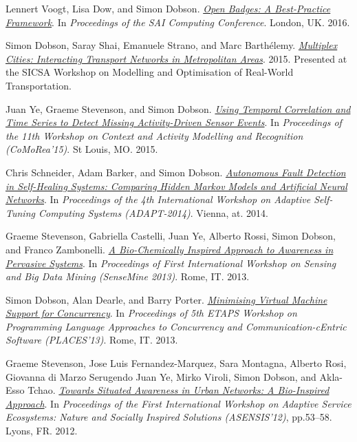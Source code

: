 \documentclass[11pt]{article}
\begin{document}
\label{org9da4b8c}Lennert Voogt, Lisa Dow, and Simon Dobson.  \emph{\href{https://simondobson.org/softcopy/open-badges-best-practice-16.pdf}{Open Badges: A Best-Practice Framework}}. In \emph{Proceedings of the SAI Computing Conference}. London, UK. 2016.

\label{org7ed4e9d}Simon Dobson, Saray Shai, Emanuele Strano, and Marc Barthélemy.  \emph{\href{https://simondobson.org/softcopy/urban-networks-sicsa.pdf}{Multiplex Cities: Interacting Transport Networks in Metropolitan Areas}}. 2015. Presented at the SICSA Workshop on Modelling and Optimisation of Real-World Transportation.

\label{org1a6029d}Juan Ye, Graeme Stevenson, and Simon Dobson.  \emph{\href{https://simondobson.org/softcopy/comorea-15.pdf}{Using Temporal Correlation and Time Series to Detect Missing Activity-Driven Sensor Events}}. In \emph{Proceedings of the 11th Workshop on Context and Activity Modelling and Recognition (CoMoRea’15)}. St Louis, MO. 2015.

\label{orgf545693}Chris Schneider, Adam Barker, and Simon Dobson.  \emph{\href{https://simondobson.org/softcopy/adapt14.pdf}{Autonomous Fault Detection in Self-Healing Systems: Comparing Hidden Markov Models and Artificial Neural Networks}}. In \emph{Proceedings of the 4th International Workshop on Adaptive Self-Tuning Computing Systems (ADAPT-2014)}. Vienna, at. 2014.

\label{orge16f070}Graeme Stevenson, Gabriella Castelli, Juan Ye, Alberto Rossi, Simon Dobson, and Franco Zambonelli.  \emph{\href{https://simondobson.org/softcopy/sensemine13.pdf}{A Bio-Chemically Inspired Approach to Awareness in Pervasive Systems}}. In \emph{Proceedings of First International Workshop on Sensing and Big Data Mining (SenseMine 2013)}. Rome, IT. 2013.

\label{orgdd9338e}Simon Dobson, Alan Dearle, and Barry Porter.  \emph{\href{https://simondobson.org/softcopy/places-2013-final.pdf}{Minimising Virtual Machine Support for Concurrency}}. In \emph{Proceedings of 5th ETAPS Workshop on Programming Language Approaches to Concurrency and Communication-cEntric Software (PLACES’13)}. Rome, IT. 2013.

\label{org7bb207d}Graeme Stevenson, Jose Luis Fernandez-Marquez, Sara Montagna, Alberto Rosi, Giovanna di Marzo Serugendo Juan Ye, Mirko Viroli, Simon Dobson, and Akla-Esso Tchao.  \emph{\href{https://simondobson.org/softcopy/asensis-12-urban.pdf}{Towards Situated Awareness in Urban Networks: A Bio-Inspired Approach}}. In \emph{Proceedings of the First International Workshop on Adaptive Service Ecosystems: Nature and Socially Inspired Solutions (ASENSIS’12)}, pp.53–58. Lyons, FR. 2012.
\end{document}
